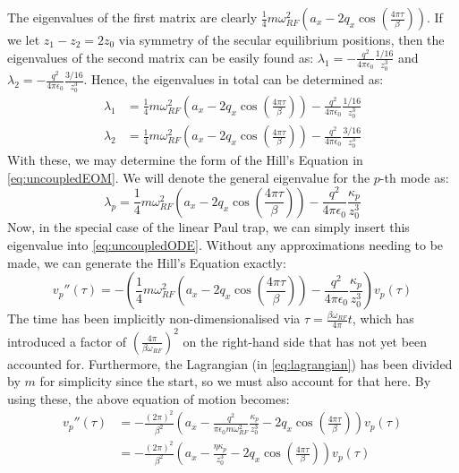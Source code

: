 \documentclass{article}
\begin{document}
The eigenvalues of the first matrix are clearly $\frac{1}{4} m \omega_{RF}^2 \left(a_x - 2 q_x \cos(\frac{4 \pi \tau}{\beta}) \right)$. If we let $z_1 - z_2 = 2 z_0$ via symmetry of the secular equilibrium positions, then the eigenvalues of the second matrix can be easily found as: $\lambda_1 = -  \frac{q^2}{4 \pi \epsilon_0} \frac{1/16}{z_0^3}$ and $\lambda_2 = -  \frac{q^2}{4 \pi \epsilon_0} \frac{3/16}{z_0^3}$. Hence, the eigenvalues in total can be determined as:
\begin{align}
\lambda_1 & = \frac{1}{4} m \omega_{RF}^2 \left( a_x - 2 q_x \cos(\frac{4 \pi \tau}{\beta}) \right) -  \frac{q^2}{4 \pi \epsilon_0} \frac{1/16}{z_0^3} \\
\lambda_2 & = \frac{1}{4} m \omega_{RF}^2 \left( a_x - 2 q_x \cos(\frac{4 \pi \tau}{\beta})\right) -  \frac{q^2}{4 \pi \epsilon_0} \frac{3/16}{z_0^3}
\end{align}
With these, we may determine the form of the Hill's Equation in \eqref{eq:uncoupledEOM}. We will denote the general eigenvalue for the $p$-th mode as:
\begin{equation}
\lambda_p = \frac{1}{4} m \omega_{RF}^2 \left(a_x - 2 q_x \cos(\frac{4 \pi \tau}{\beta}) \right) - \frac{q^2}{4 \pi \epsilon_0} \frac{\kappa_p}{z_0^3}
\end{equation}
Now, in the special case of the linear Paul trap, we can simply insert this eigenvalue into \eqref{eq:uncoupledODE}. Without any approximations needing to be made, we can generate the Hill's Equation exactly:
\begin{equation*}
v_p'' (\tau) = - \left( \frac{1}{4} m \omega_{RF}^2 \left(a_x - 2 q_x \cos(\frac{4 \pi \tau}{\beta}) \right) - \frac{q^2}{4 \pi \epsilon_0} \frac{\kappa_p}{z_0^3} \right) v_p (\tau)
\end{equation*}
The time has been implicitly non-dimensionalised via $\tau = \frac{\beta \omega_{RF}}{4 \pi} t$, which has introduced a factor of $\left( \frac{4 \pi}{\beta \omega_{RF}} \right)^2$ on the right-hand side that has not yet been accounted for. Furthermore, the Lagrangian (in \eqref{eq:lagrangian}) has been divided by $m$ for simplicity since the start, so we must also account for that here. By using these, the above equation of motion becomes:
\begin{align*}
	v_p'' (\tau) & = - \frac{(2 \pi)^2}{\beta^2} \left(a_x - \frac{q^2}{\pi \epsilon_0  m \omega_{RF}^2} \frac{\kappa_p}{z_0^3} - 2 q_x \cos(\frac{4 \pi \tau}{\beta})  \right) v_p (\tau) \\
	& = - \frac{(2 \pi)^2}{\beta^2} \left(a_x - \frac{\eta \kappa_p}{z_0^3} - 2 q_x \cos( \frac{4 \pi \tau}{\beta} ) \right) v_p (\tau) \\
\end{align*}
\end{document}
